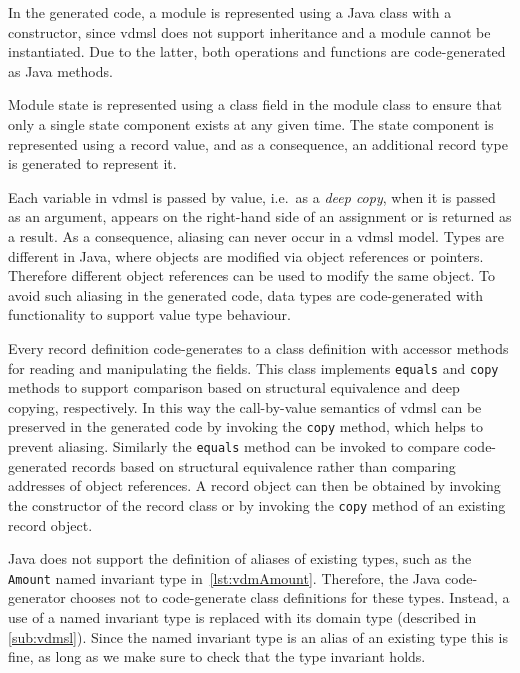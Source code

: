 In the generated code, a module is represented using a  Java
class with a  constructor, since \ac{vdmsl} does not
support inheritance and a module cannot be instantiated. Due to the
latter, both operations and functions are code-generated as
 Java methods.

Module state is represented using a  class field in the
module class to ensure that only a single state component exists at
any given time. The state component is represented using a record
value, and as a consequence, an additional record type is 
generated to represent it.

Each variable in \ac{vdmsl} is passed by value, i.e.\ as a \emph{deep
  copy}, when it is passed as an argument, appears on the right-hand
side of an assignment or is returned as a result. As a consequence,
aliasing can never occur in a \ac{vdmsl} model. Types are different in
Java, where objects are modified via object references or
pointers. Therefore different object references can be used to modify
the same object. To avoid such aliasing in the generated code, data
types are code-generated with functionality to support value type
behaviour.

Every record definition code-generates to a class definition with
accessor methods for reading and manipulating the fields. This class
implements \texttt{equals} and \texttt{copy} methods to support
comparison based on structural equivalence and deep copying,
respectively. In this way the call-by-value semantics of \ac{vdmsl}
can be preserved in the generated code by invoking the \texttt{copy}
method, which helps to prevent aliasing. Similarly the \texttt{equals}
method can be invoked to compare code-generated records based on
structural equivalence rather than comparing addresses of object
references. A record object can then be obtained by invoking the
constructor of the record class or by invoking the \texttt{copy}
method of an existing record object.

Java does not support the definition of aliases of existing types,
such as the \texttt{Amount} named invariant type
in~\autoref{lst:vdmAmount}. Therefore, the Java code-generator chooses
not to code-generate class definitions for these types. Instead, a use of
a named invariant type is replaced with its domain type (described
in \autoref{sub:vdmsl}). Since the named invariant type is an alias of
an existing type this is fine, as long as we make sure to check that
the type invariant holds.



